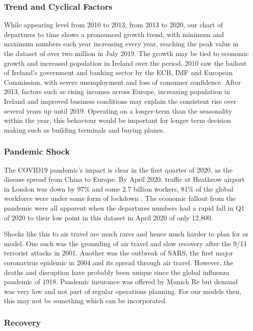 \documentclass[conference]{IEEEtran}
\begin{document}
\subsubsection{Trend and Cyclical Factors} While appearing level from 2010 to 2013, from 2013 to 2020, our chart of departures to time shows a pronounced growth trend, with minimum and maximum numbers each year increasing every year, reaching the peak value in the dataset of over two million in July 2019.  The growth may be tied to economic growth and increased population in Ireland over the period.   2010 saw the bailout of Ireland's government and banking sector by the ECB, IMF and European Commission, with severe unemployment and loss of consumer confidence.  After 2013, factors such as rising incomes across Europe, increasing population in Ireland and improved business conditions may explain the consistent rise over several years up until 2019.  Operating on a longer-term than the seasonality within the year, this behaviour would be important for longer term decision making such as building terminals and buying planes.  

\subsubsection{Pandemic Shock}
The COVID19 pandemic's impact is clear in the first quarter of 2020, as the disease spread from China to Europe.  By April 2020, traffic at Heathrow airport in London was down by 97\% and some 2.7 billion workers, 81\% of the global workforce were under some form of lockdown \cite{tooze21}.  The economic fallout from the pandemic were all apparent when the departures numbers had a rapid fall in Q1 of 2020 to their low point in this dataset in April 2020 of only 12,800.  

Shocks like this to air travel are much rarer and hence much harder to plan for or model.   One such was the grounding of air travel and slow recovery after the 9/11 terrorist attacks in 2001.  Another was the outbreak of SARS, the first major coronavirus epidemic in 2004 and its spread through air travel\cite{greenfeld06}.  However, the deaths and disruption have probably been unique since the global influenza pandemic of 1918.  Pandemic insurance was offered by Munich Re but demand was very low and not part of regular operations planning. For our models then, this may not be something which can be incorporated.  

\subsubsection{Recovery}
\end{document}
